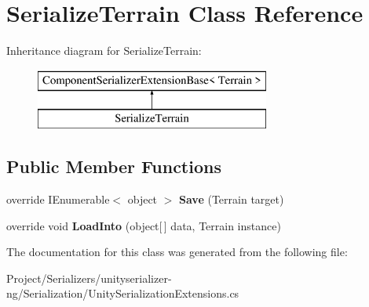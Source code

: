 \hypertarget{class_serialize_terrain}{}\section{Serialize\+Terrain Class Reference}
\label{class_serialize_terrain}
Inheritance diagram for Serialize\+Terrain\+:\begin{figure}[H]
\begin{center}
\leavevmode
\includegraphics[height=2.000000cm]{class_serialize_terrain}
\end{center}
\end{figure}
\subsection*{Public Member Functions}
\begin{DoxyCompactItemize}
\item 
\mbox{\label{class_serialize_terrain_aab7a541af72244820a5b2231dec7a4dd}} 
override I\+Enumerable$<$ object $>$ {\bfseries Save} (Terrain target)
\item 
\mbox{\label{class_serialize_terrain_ae48128e79b26ed6508af94b865005290}} 
override void {\bfseries Load\+Into} (object\mbox{[}$\,$\mbox{]} data, Terrain instance)
\end{DoxyCompactItemize}


The documentation for this class was generated from the following file\+:\begin{DoxyCompactItemize}
\item 
Project/\+Serializers/unityserializer-\/ng/\+Serialization/Unity\+Serialization\+Extensions.\+cs\end{DoxyCompactItemize}
